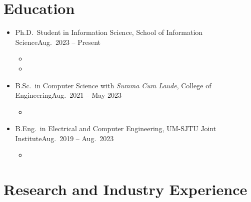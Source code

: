 \documentclass[letterpaper,10.8pt]{article}
\begin{document}
\head%

\section{Education}

\begin{itemize}
      \item {}
            {Ph.D.\ Student in Information Science, School of Information Science}{Aug.\ 2023 -- Present}
            \begin{itemize}
                  \item {}
                  \item {}
            \end{itemize}

      \item {}
            {B.Sc.\ in Computer Science with \emph{Summa Cum Laude}, College of Engineering}{Aug.\ 2021 -- May 2023}
            \begin{itemize}
                  \item {}
            \end{itemize}

      \item {}
            {B.Eng.\ in Electrical and Computer Engineering, UM-SJTU Joint Institute}{Aug.\ 2019 -- Aug.\ 2023}
            \begin{itemize}
                  \item {}
            \end{itemize}
\end{itemize}

\section{Research and Industry Experience}
\end{document}
